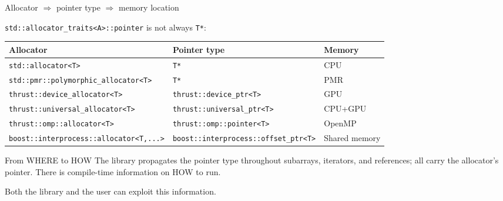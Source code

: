 \begin{frame}[fragile]{Allocator $\Rightarrow$ pointer type $\Rightarrow$ memory location}

\lstinline|std::allocator_traits<A>::pointer| is not always \lstinline|T*|:

\medskip
\begin{tabular}{@{}lll@{}}
\hline
\textbf{Allocator} & \textbf{Pointer type} & \textbf{Memory} \\
\hline
\lstinline|std::allocator<T>|                        & \lstinline|T*|                                 & CPU \\
\lstinline|std::pmr::polymorphic_allocator<T>|       & \lstinline|T*|                                 & PMR \\
\lstinline|thrust::device_allocator<T>|              & \lstinline|thrust::device_ptr<T>|              & GPU \\
\lstinline|thrust::universal_allocator<T>|           & \lstinline|thrust::universal_ptr<T>|           & CPU+GPU \\
\lstinline|thrust::omp::allocator<T>|                & \lstinline|thrust::omp::pointer<T>|            & OpenMP \\
\lstinline|boost::interprocess::allocator<T,...>|    & \lstinline|boost::interprocess::offset_ptr<T>| & Shared memory \\
\hline
\end{tabular}

\medskip

\begin{alertblock}{From WHERE to HOW}
The library propagates the pointer type throughout subarrays, iterators,
and references; all carry the allocator's pointer.
There is compile-time information on HOW to run.
\end{alertblock}

Both the library and the user can exploit this information.

\end{frame}

